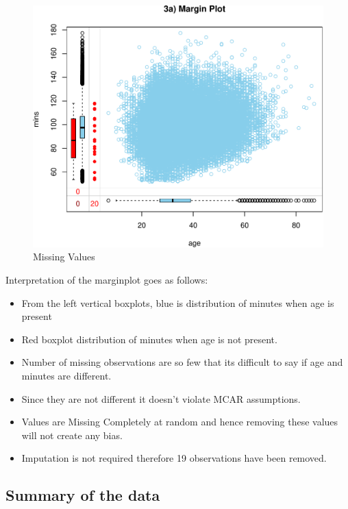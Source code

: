 \documentclass[
]{article}
\providecommand{\tightlist}{%
  \setlength{\itemsep}{0pt}\setlength{\parskip}{0pt}}
\begin{document}
\begin{figure}[H]

{\centering \includegraphics{case_study02_files/figure-latex/unnamed-chunk-7-1} 

}

\caption{Missing Values}\label{fig:unnamed-chunk-7}
\end{figure}

Interpretation of the marginplot goes as follows:

\begin{itemize}
\tightlist
\item
  From the left vertical boxplots, blue is distribution of minutes when
  age is present
\item
  Red boxplot distribution of minutes when age is not present.
\item
  Number of missing observations are so few that its difficult to say if
  age and minutes are different.
\item
  Since they are not different it doesn't violate MCAR assumptions.
\item
  Values are Missing Completely at random and hence removing these
  values will not create any bias.
\item
  Imputation is not required therefore 19 observations have been
  removed.
\end{itemize}

\hypertarget{summary-of-the-data}{%
\subsection{Summary of the data}\label{summary-of-the-data}}
\end{document}
